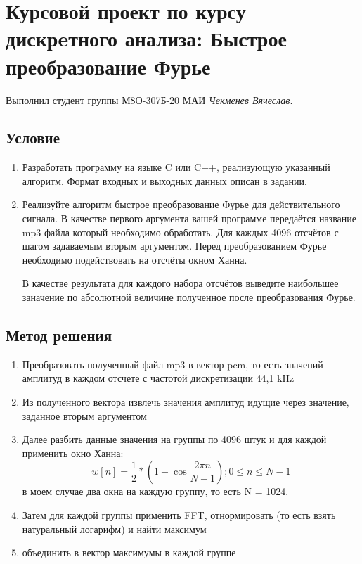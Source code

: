 \documentclass[12pt]{article}
\begin{document}
    \section*{Курсовой проект по курсу дискрeтного анализа: 
    Быстрое преобразование Фурье}

    Выполнил студент группы М8О-307Б-20 МАИ \textit{Чекменев Вячеслав}.
    \subsection*{Условие}
 
    \begin{enumerate}
    \item Разработать программу на языке C или C++, реализующую указанный
    алгоритм. Формат входных и выходных данных описан в задании.
    \item Реализуйте алгоритм быстрое преобразование Фурье для действительного сигнала. В качестве первого аргумента вашей программе передаётся название mp3 файла который необходимо обработать. Для каждых 4096 отсчётов с шагом задаваемым вторым аргументом. Перед преобразованием Фурье необходимо подействовать на отсчёты окном Ханна.
    
    В качестве результата для каждого набора отсчётов выведите наибольшее заначение по абсолютной величине полученное после преобразования Фурье.
    \end{enumerate}

    \subsection*{Метод решения}

    \begin{enumerate}
        \item Преобразовать полученный файл mp3 в вектор pcm, то есть значений амплитуд в каждом отсчете с частотой дискретизации 44,1 kHz
        \item Из полученного вектора извлечь значения амплитуд идущие через значение, заданное вторым аргументом
        \item Далее разбить данные значения на группы по 4096 штук и для каждой применить окно
        Ханна: $$w[n] = \frac{1}{2} * (1 - \cos{\frac{2\pi n}{N - 1}}); 0 \leq n \leq N - 1$$ в моем случае два окна на каждую группу, то есть N = 1024.
        \item Затем для каждой группы применить FFT, отнормировать (то есть взять натуральный логарифм) и найти максимум
        \item объединить в вектор максимумы в каждой группе
    \end{enumerate}
\end{document}
